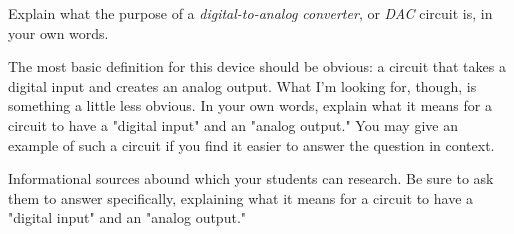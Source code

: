 

Explain what the purpose of a {\it digital-to-analog converter}, or {\it DAC} circuit is, in your own words.







The most basic definition for this device should be obvious: a circuit that takes a digital input and creates an analog output.  What I'm looking for, though, is something a little less obvious.  In your own words, explain what it means for a circuit to have a "digital input" and an "analog output."  You may give an example of such a circuit if you find it easier to answer the question in context.







Informational sources abound which your students can research.  Be sure to ask them to answer specifically, explaining what it means for a circuit to have a "digital input" and an "analog output."




